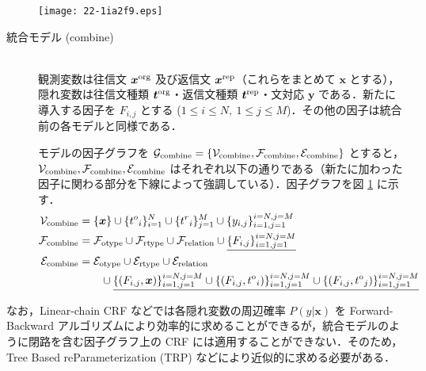 \documentclass[japanese]{jnlp_1.4}
\begin{document}
\begin{figure}[t]
\begin{center}
\texttt{[image: 22-1ia2f9.eps]}
\end{center}
\label{fig:model-after}
\end{figure}

\begin{description}
\item[統合モデル (combine)] \mbox{} \\
   観測変数は往信文 $\bm{x}^{\rm org}$ 及び返信文 $\bm{x}^{\rm rep}$（これらをまとめて $\bm{x}$ とする），隠れ変数は往信文種類 ${\bm{t}^{\rm org}}$・返信文種類 ${\bm{t}^{\rm rep}}$・文対応 $\bm{y}$ である．新たに導入する因子を $F_{i,j}$ とする  ($1 \leq i \leq N,~ 1 \leq j \leq M$)．その他の因子は統合前の各モデルと同様である．

  モデルの因子グラフを $\mathcal{G}_{\rm combine} = \{ \mathcal{V}_{\rm combine}, \mathcal{F}_{\rm combine}, \mathcal{E}_{\rm combine} \}$ とすると，\\ $\mathcal{V}_{\rm combine}, \mathcal{F}_{\rm combine}, \mathcal{E}_{\rm combine}$ はそれぞれ以下の通りである（新たに加わった因子に関わる部分を下線によって強調している）．因子グラフを図 \ref{fig:model-after} に示す．
\begin{equation}
 \begin{split}
  \mathcal{V}_{\rm combine} &= \{ \bm{x} \} \cup \{ {t^o}_i \}_{i=1}^{N} \cup \{ {t^r}_i \}_{j=1}^{M} \cup\{ {y}_{i,j} \}_{i=1,j=1}^{i=N,j=M} \\
  \mathcal{F}_{\rm combine} &= \mathcal{F}_{\rm otype} \cup \mathcal{F}_{\rm rtype} 
	\cup \mathcal{F}_{\rm relation} \cup \underline{\{ {F}_{i,j} \}_{i=1,j=1}^{i=N,j=M}} \\
  \mathcal{E}_{\rm combine} &= \mathcal{E}_{\rm otype} \cup \mathcal{E}_{\rm rtype} \cup \mathcal{E}_{\rm relation} \\
   & \qquad \cup \underline{\{ ({F}_{i,j}, \bm{x}) \}_{i=1,j=1}^{i=N,j=M} \cup \{ ({F}_{i,j}, {t^{\rm o}}_{i}) \}_{i=1,j=1}^{i=N,j=M} 
	\cup \{ ({F}_{i,j}, {t^{\rm o}}_{j}) \}_{i=1,j=1}^{i=N,j=M}}
 \end{split}
\end{equation}
\end{description}

なお，Linear-chain CRF などでは各隠れ変数の周辺確率 $P(y|\mathbf{x})$ を Forward-Backward アルゴリズムにより効率的に求めることができるが，統合モデルのように閉路を含む因子グラフ上の CRF には適用することができない．そのため，Tree Based reParameterization (TRP) \cite{Wainwright2001b} などにより近似的に求める必要がある．
\end{document}
